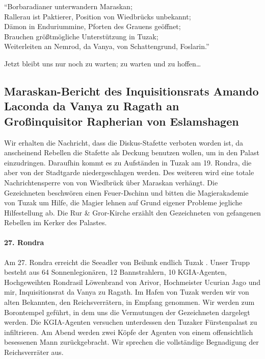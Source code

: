 ``Borbaradianer unterwandern Maraskan;\\
Rallerau ist Paktierer, Position von Wiedbrücks unbekannt;\\
Dämon in Enduriummine, Pforten des Grauens geöffnet;\\
Brauchen größtmögliche Unterstützung in Tuzak;\\
Weiterleiten an Nemrod, da Vanya, von Schattengrund, Foslarin.''

Jetzt bleibt uns nur noch zu warten; zu warten und zu hoffen\dots

\subsection{Maraskan-Bericht des Inquisitionsrats Amando Laconda da Vanya zu Ragath an Großinquisitor Rapherian von Eslamshagen}

Wir erhalten die Nachricht, dass die Diskus-Stafette verboten worden ist, da anscheinend Rebellen die Stafette als Deckung benutzen wollen, um in den Palast einzudringen. Daraufhin kommt es zu Aufständen in Tuzak am 19. Rondra, die aber von der Stadtgarde niedergeschlagen werden. Des weiteren wird eine totale Nachrichtensperre von von Wiedbrück über Maraskan verhängt. Die Gezeichneten beschwören einen Feuer-Dschinn und bitten die Magierakademie von Tuzak um Hilfe, die Magier lehnen auf Grund eigener Probleme jegliche Hilfestellung ab. Die Rur \& Gror-Kirche erzählt den Gezeichneten von gefangenen Rebellen im Kerker des Palastes.

\paragraph{27. Rondra}
Am 27. Rondra erreicht die Seeadler von Beilunk endlich Tuzak . Unser Trupp besteht aus 64 Sonnenlegionären, 12 Bannstrahlern, 10 KGIA-Agenten, Hochgeweihten Rondrasil Löwenbrand von Arivor, Hochmeister Ucurian Jago und mir, Inquisitionsrat da Vanya zu Ragath. Im Hafen von Tuzak werden wir von alten Bekannten, den Reichsverrätern, in Empfang genommen. Wir werden zum Borontempel geführt, in dem uns die Vermutungen der Gezeichneten dargelegt werden. Die KGIA-Agenten versuchen unterdessen den Tuzaker Fürstenpalast zu infiltrieren. Am Abend werden zwei Köpfe der Agenten von einem offensichtlich besessenen Mann zurückgebracht. Wir sprechen die vollständige Begnadigung der Reichsverräter aus.

